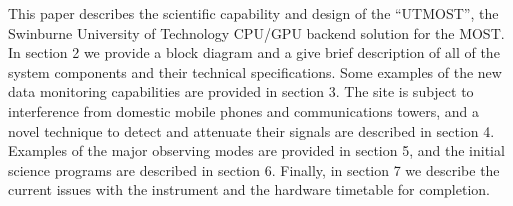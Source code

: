 This paper describes the scientific capability and design of the ``UTMOST'', the Swinburne University of Technology CPU/GPU backend solution for the MOST. In section 2 we provide a block diagram and a give brief description of all of the system components and their technical specifications. Some examples of the new data monitoring capabilities are provided in section 3. The site is subject to interference from domestic mobile phones and communications towers, and a novel technique to detect and attenuate their signals are described in section 4. Examples of the major observing modes are provided in section 5, and the initial science programs are described in section 6. Finally, in section 7 we describe the current issues with the instrument and the hardware timetable for completion.
  